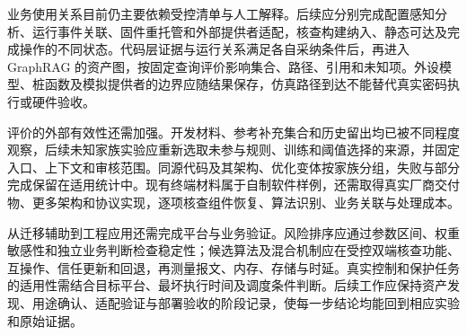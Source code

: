 业务使用关系目前仍主要依赖受控清单与人工解释。后续应分别完成配置感知分析、运行事件关联、固件重托管和外部提供者适配，核查构建纳入、静态可达及完成操作的不同状态。代码层证据与运行关系满足各自采纳条件后，再进入 GraphRAG 的资产图，按固定查询评价影响集合、路径、引用和未知项。外设模型、桩函数及模拟提供者的边界应随结果保存，仿真路径到达不能替代真实密码执行或硬件验收。

评价的外部有效性还需加强。开发材料、参考补充集合和历史留出均已被不同程度观察，后续未知家族实验应重新选取未参与规则、训练和阈值选择的来源，并固定入口、上下文和审核范围。同源代码及其架构、优化变体按家族分组，失败与部分完成保留在适用统计中。现有终端材料属于自制软件样例，还需取得真实厂商交付物、更多架构和协议实现，逐项核查组件恢复、算法识别、业务关联与处理成本。

从迁移辅助到工程应用还需完成平台与业务验证。风险排序应通过参数区间、权重敏感性和独立业务判断检查稳定性；候选算法及混合机制应在受控双端核查功能、互操作、信任更新和回退，再测量报文、内存、存储与时延。真实控制和保护任务的适用性需结合目标平台、最坏执行时间及调度条件判断。后续工作应保持资产发现、用途确认、适配验证与部署验收的阶段记录，使每一步结论均能回到相应实验和原始证据。
